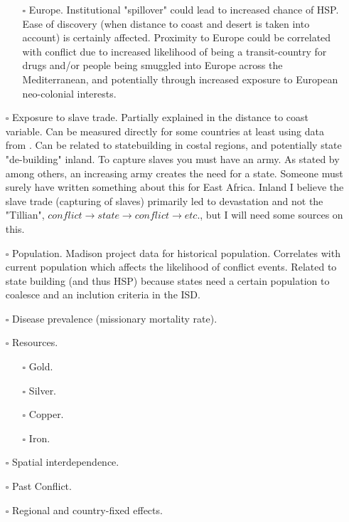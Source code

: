 \documentclass[12pt]{article}
\begin{document}
\begin{itemize}
\begin{itemize}
		\item[$\square$] Europe. Institutional "spillover" could lead to
			increased chance of HSP. Ease of discovery (when
			distance to coast and desert is taken into account) is
			certainly affected. Proximity to Europe could be
			correlated with conflict due to increased likelihood of
			being a transit-country for drugs and/or people being
			smuggled into Europe across the Mediterranean, and
			potentially through increased exposure to European
			neo-colonial interests. 
	\end{itemize}

	\item[$\square$] Exposure to slave trade. Partially explained in the
		distance to coast variable. Can be measured directly for some
		countries at least using data from \citet{Nunn2008}. Can be
		related to statebuilding in costal regions, and potentially
		state "de-building" inland. To capture slaves you must have an
		army. As stated by \citet{Tilly1990} among others, an increasing
		army creates the need for a state. Someone must surely have
		written something about this for East Africa. Inland I believe
		the slave trade (capturing of slaves) primarily led to
		devastation and not the "Tillian", $conflict \rightarrow state
		\rightarrow conflict \rightarrow etc.$, but I will need some sources
		on this.

	\item[$\square$] Population. Madison project data for historical
		population. Correlates with current population which affects the
		likelihood of conflict events. Related to state building (and
		thus HSP) because states need a certain population to coalesce
		and an inclution criteria in the ISD.

	\item[$\square$] Disease prevalence (missionary mortality rate).

	\item[$\square$] Resources.
	\begin{itemize}
		\item[$\square$] Gold.

		\item[$\square$] Silver.
			
		\item[$\square$] Copper.

		\item[$\square$] Iron.
	\end{itemize}

	\item[$\square$] Spatial interdependence.

	\item[$\square$] Past Conflict.

	\item[$\square$] Regional and country-fixed effects.
\end{itemize}
\end{document}
